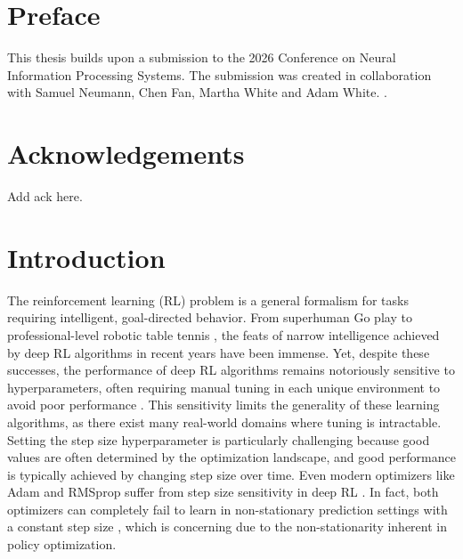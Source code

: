   \chapter*{Preface} 
  This thesis builds upon a submission to the 2026 Conference on Neural Information Processing Systems. The submission was created in collaboration with Samuel Neumann, Chen Fan, Martha White and Adam White. . 
  
  \chapter*{Acknowledgements} 
  Add ack here.
  
  \tableofcontents
  \listoftables
  \listoffigures
  \listofalgorithms {}
  
  \chapter{Introduction} \label{sec: introduction}
  
  \setcounter{page}{1}
  \renewcommand{\thepage}{\arabic{page}} %
  
  The reinforcement learning (RL) problem is a general formalism for tasks requiring intelligent, goal-directed behavior. From superhuman Go play  to professional-level robotic table tennis , the feats of narrow intelligence achieved by deep RL algorithms in recent years have been immense. Yet, despite these successes, the performance of deep RL algorithms remains notoriously sensitive to hyperparameters, often requiring manual tuning in each unique environment to avoid poor performance \cite{eimer2023hyperparameters,adkins2024method}. This sensitivity limits the generality of these learning algorithms, as there exist many real-world domains where tuning is intractable. Setting the step size hyperparameter is particularly challenging because good values are often determined by the optimization landscape, and good performance is typically achieved by changing step size over time. Even modern optimizers like Adam and RMSprop suffer from step size sensitivity in deep RL \cite{ellis2024adam,donancio2024dynamic,jordan2024cliff}. In fact, both optimizers can completely fail to learn in non-stationary prediction settings with a constant step size \cite{jacobsen2019meta,degris2024step}, which is concerning due to the non-stationarity inherent in policy optimization.
  
